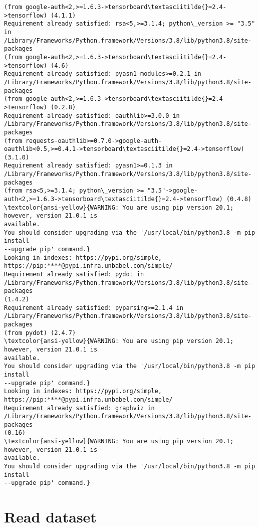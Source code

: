 \documentclass[11pt]{article}
\begin{document}
\begin{Verbatim}[commandchars=\\\{\}]
(from google-auth<2,>=1.6.3->tensorboard\textasciitilde{}=2.4->tensorflow) (4.1.1)
Requirement already satisfied: rsa<5,>=3.1.4; python\_version >= "3.5" in
/Library/Frameworks/Python.framework/Versions/3.8/lib/python3.8/site-packages
(from google-auth<2,>=1.6.3->tensorboard\textasciitilde{}=2.4->tensorflow) (4.6)
Requirement already satisfied: pyasn1-modules>=0.2.1 in
/Library/Frameworks/Python.framework/Versions/3.8/lib/python3.8/site-packages
(from google-auth<2,>=1.6.3->tensorboard\textasciitilde{}=2.4->tensorflow) (0.2.8)
Requirement already satisfied: oauthlib>=3.0.0 in
/Library/Frameworks/Python.framework/Versions/3.8/lib/python3.8/site-packages
(from requests-oauthlib>=0.7.0->google-auth-
oauthlib<0.5,>=0.4.1->tensorboard\textasciitilde{}=2.4->tensorflow) (3.1.0)
Requirement already satisfied: pyasn1>=0.1.3 in
/Library/Frameworks/Python.framework/Versions/3.8/lib/python3.8/site-packages
(from rsa<5,>=3.1.4; python\_version >= "3.5"->google-
auth<2,>=1.6.3->tensorboard\textasciitilde{}=2.4->tensorflow) (0.4.8)
\textcolor{ansi-yellow}{WARNING: You are using pip version 20.1; however, version 21.0.1 is
available.
You should consider upgrading via the '/usr/local/bin/python3.8 -m pip install
--upgrade pip' command.}
Looking in indexes: https://pypi.org/simple,
https://pip:****@pypi.infra.unbabel.com/simple/
Requirement already satisfied: pydot in
/Library/Frameworks/Python.framework/Versions/3.8/lib/python3.8/site-packages
(1.4.2)
Requirement already satisfied: pyparsing>=2.1.4 in
/Library/Frameworks/Python.framework/Versions/3.8/lib/python3.8/site-packages
(from pydot) (2.4.7)
\textcolor{ansi-yellow}{WARNING: You are using pip version 20.1; however, version 21.0.1 is
available.
You should consider upgrading via the '/usr/local/bin/python3.8 -m pip install
--upgrade pip' command.}
Looking in indexes: https://pypi.org/simple,
https://pip:****@pypi.infra.unbabel.com/simple/
Requirement already satisfied: graphviz in
/Library/Frameworks/Python.framework/Versions/3.8/lib/python3.8/site-packages
(0.16)
\textcolor{ansi-yellow}{WARNING: You are using pip version 20.1; however, version 21.0.1 is
available.
You should consider upgrading via the '/usr/local/bin/python3.8 -m pip install
--upgrade pip' command.}
    \end{Verbatim}

    \hypertarget{read-dataset}{%
\section{Read dataset}\label{read-dataset}}
\end{document}
